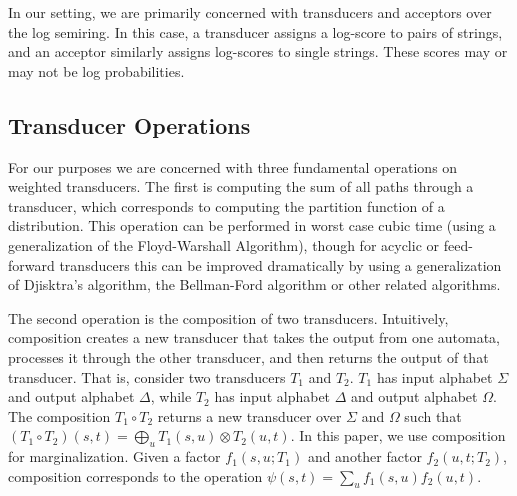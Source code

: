 \documentclass[11pt,a4paper]{article}
\begin{document}

In our setting, we are primarily concerned with transducers and
acceptors over the log semiring. In this case, a transducer assigns
a log-score to pairs of strings, and an acceptor similarly assigns
log-scores to single strings. These scores may or may not be
log probabilities.

\subsection{Transducer Operations}

For our purposes we are concerned with three fundamental operations
on weighted transducers. The first is computing the sum of all paths through a
transducer, which corresponds to computing the partition function
of a distribution. This operation can be performed in worst case
cubic time (using a generalization of the Floyd-Warshall Algorithm),
though for acyclic or feed-forward transducers this can be improved
dramatically by using a generalization of Djisktra's algorithm, the
Bellman-Ford algorithm or other related algorithms.

The second operation is the composition of two transducers. Intuitively,
composition creates a new transducer that takes the output from one
automata, processes it through the other transducer, and then returns
the output of that transducer. That is, consider two transducers
$T_1$ and $T_2$. $T_1$ has input alphabet $\Sigma$ and output
alphabet $\Delta$, while $T_2$ has input alphabet $\Delta$ and
output alphabet $\Omega$. The composition $T_1 \circ T_2$ returns
a new transducer over $\Sigma$ and $\Omega$ such that $(T_1 \circ
T_2)(s,t) = \bigoplus_{u} T_1(s,u)\otimes T_2(u,t)$. In this paper,
we use composition for marginalization. Given a factor $f_1(s,u;T_1)$
and another factor $f_2(u,t;T_2)$, composition corresponds to the
operation $\psi(s,t) = \sum_u f_1(s,u) f_2(u,t)$.
\end{document}
